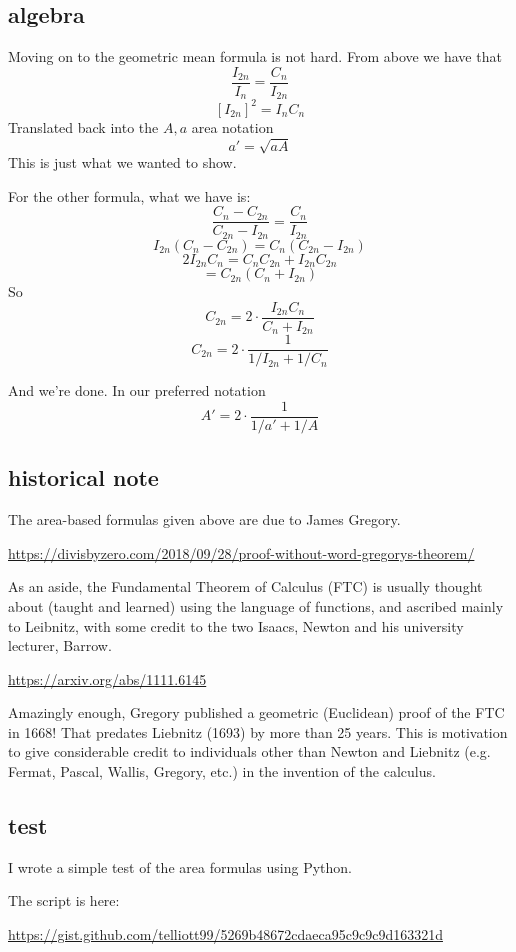 \documentclass[11pt, oneside]{article}
\begin{document}
\subsection*{algebra}
Moving on to the geometric mean formula is not hard.  From above we have that
\[ \frac{I_{2n}}{I_n} = \frac{C_n}{I_{2n}}   \]
\[ [I_{2n}]^2 = I_n C_n  \]
Translated back into the $A,a$ area notation
\[ a' = \sqrt{aA} \]
This is just what we wanted to show.

For the other formula, what we have is:
\[ \frac{C_n - C_{2n}}{C_{2n} - I_{2n}} = \frac{C_n}{I_{2n}}   \]
\[ I_{2n} (C_n - C_{2n}) = C_n (C_{2n} - I_{2n}) \]
\[ 2 I_{2n} C_n = C_n C_{2n} + I_{2n} C_{2n} \]
\[ = C_{2n}(C_{n} + I_{2n}) \]
So
\[ C_{2n}  = 2 \cdot \frac{I_{2n} C_n} {C_{n} + I_{2n}}  \]
\[ C_{2n} = 2 \cdot \frac{1}{1/I_{2n} + 1/C_n} \]

And we're done.  In our preferred notation
\[ A' = 2 \cdot \frac{1}{1/a' + 1/A} \]

\subsection*{historical note}

The area-based formulas given above are due to James Gregory.

\url{https://divisbyzero.com/2018/09/28/proof-without-word-gregorys-theorem/}

As an aside, the Fundamental Theorem of Calculus (FTC) is usually thought about (taught and learned) using the language of functions, and ascribed mainly to Leibnitz, with some credit to the two Isaacs, Newton and his university lecturer, Barrow.

\url{https://arxiv.org/abs/1111.6145}

Amazingly enough, Gregory published a geometric (Euclidean) proof of the FTC in 1668!  That predates Liebnitz (1693) by more than 25 years.  This is motivation to give considerable credit to individuals other than Newton and Liebnitz (e.g. Fermat, Pascal, Wallis, Gregory, etc.) in the invention of the calculus.

\subsection*{test}
I wrote a simple test of the area formulas using Python.

The script is here:

\url{https://gist.github.com/telliott99/5269b48672cdaeca95c9c9c9d163321d}
\end{document}
